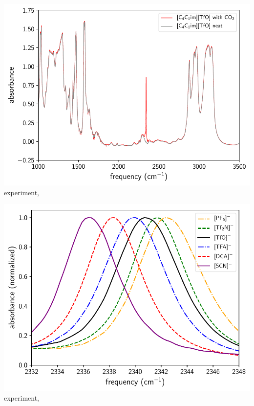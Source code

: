 \documentclass[xcolor=usenames,dvipsnames,svgnames]{beamer}
\begin{document}
\begin{frame}
  \centering
  \includegraphics[width=\linewidth,keepaspectratio]{./figures/experimental_spectra_TfO.pdf}
  \scriptsize
  experiment, \ce{[C4C1im][TfO]}
\end{frame}

\begin{frame}
  \centering
  \includegraphics[width=\linewidth,keepaspectratio]{./figures/experimental_spectra_shifting.pdf}
  \scriptsize
  experiment, \ce{[C4C1im]+}
\end{frame}
\end{document}
